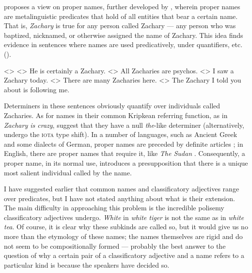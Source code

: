 \documentclass[a4paper, 12pt]{article}
\begin{document}
\textcite{burge1973referencepropernames} proposes a view on proper names, further developed by \parencite[a.m.o.]{elbourne2005situationsindividuals,maier2015referencebindingpresupposition}, wherein proper names are metalinguistic predicates that hold of all entities that bear a certain name. That is, \textit{Zachary} is true for any person called Zachary --- any person who was baptized, nicknamed, or otherwise assigned the name of Zachary. This idea finds evidence in sentences where names are used predicatively, under quantifiers, etc. (\nextx).

\pex<>
    \a<> He is certainly a Zachary.
    \a<> All Zacharies are psychos.
    \a<> I saw a Zachary today.
    \a<> There are many Zacharies here.
    \a<> The Zachary I told you about is following me.
\xe

Determiners in these sentences obviously quantify over individuals called Zacharies. As for names in their common Kripkean referring function, as in \textit{Zachary is crazy}, \textcite{larson1995knowledgemeaningintroduction,elbourne2005situationsindividuals} suggest that they have a null \textit{the}-like determiner (alternatively, undergo the \textsc{iota} type shift). In a number of languages, such as Ancient Greek and some dialects of German, proper names are preceded by definite articles \parencite{elbourne2005situationsindividuals}; in English, there are proper names that require it, like \textit{The Sudan} \parencite{krifka1995genericityintroduction}. Consequently, a proper name, in its normal use, introduces a presupposition that there is a unique most salient individual called by the name.



I have suggested earlier that common names and classificatory adjectives range over predicates, but I have not stated anything about what is their extension. The main difficulty in approaching this problem is the incredible polisemy classificatory adjectives undergo. \textit{White} in \textit{white tiger} is not the same as in \textit{white tea}. Of course, it is clear why these subkinds are called so, but it would give us no more than the etymology of these names; the names themselves are rigid and do not seem to be compositionally formed --- probably the best answer to the question of why a certain pair of a classificatory adjective and a name refers to a particular kind is because the speakers have decided so.
\end{document}
